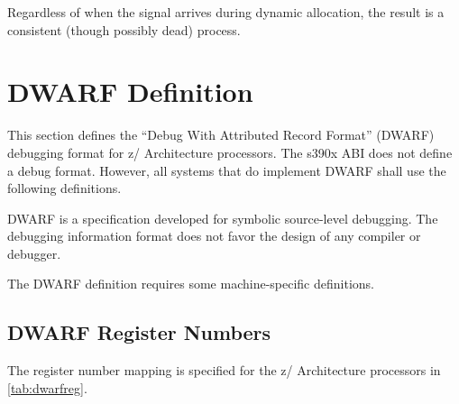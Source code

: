 \documentclass[USenglish,fontsize=11pt,twoside,%
  toc=bib,toc=idx,toc=graduated,numbers=noendperiod,
  bookmarks=true,
  bookmarksnumbered=true,
  bookmarksopen=true,
  bookmarksopenlevel=1,
  breaklinks=true,
  colorlinks=true,
  linkcolor=black,
  pdfpagelayout={TwoPageRight},
  pdfusetitle=true
]{scrreprt}
\newcommand{\ABINAME}{s390x}
\newcommand{\ARCH}{z/\kern-1pt Ar\-chi\-tec\-ture}
\newcommand{\ABINAME}{s390}
\newcommand{\ARCH}{ESA/390}
\begin{document}
Regardless of when the signal arrives during dynamic allocation, the
result is a consistent (though possibly dead) process.

\section{DWARF Definition}
This section defines the ``Debug With Attributed Record Format''
(DWARF) debugging format for \ARCH{} processors.  The
\ABINAME{} ABI does not define a debug format.  However, all systems that
do implement DWARF shall use the following definitions.

DWARF is a specification developed for symbolic source-level
debugging.  The debugging information format does not favor the design
of any compiler or debugger.

The DWARF definition requires some machine-specific definitions.

\subsection{DWARF Register Numbers}
The register number mapping is specified for the \ARCH{}
processors in \cref{tab:dwarfreg}.
\end{document}
